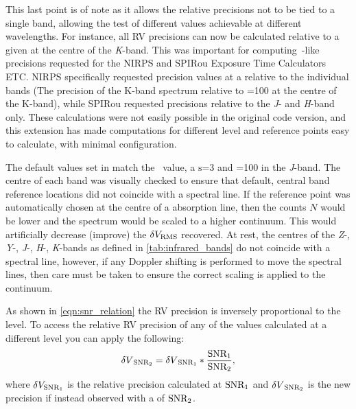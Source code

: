 This last point is of note as it allows the relative precisions not to be tied to a single band, allowing the test of different \snr{} values achievable at different wavelengths.
For instance, all {RV} precisions can now be calculated relative to a given \snr{} at the centre of the \textit{K}-band.
This was important for computing~\citet{figueira_radial_2016}-like precisions requested for the {NIRPS} and {SPIRou} Exposure Time Calculators {ETC}.
{NIRPS} specifically requested precision values at a \snr{} relative to the individual bands (The precision of the K-band spectrum relative to \snr{}=100 at the centre of the {K}-band), while {SPIRou} requested precisions relative to the \emph{J}- and \emph{H}-band only.
These calculations were not easily possible in the original code version, and this extension has made computations for different \snr{} level and reference points easy to calculate, with minimal configuration.

The default values set in \eniric{} match the~\citet{figueira_radial_2016} value, a \(\mathrm{s}\)=3 and \snr{}=100 in the \emph{J}-band.
The centre of each band was visually checked to ensure that default, central band reference locations did not coincide with a spectral line.
If the reference point was automatically chosen at the centre of a absorption line, then the counts \(N\) would be lower and the spectrum would be scaled to a higher continuum.
This would artificially decrease (improve) the \(\delta V_{\textrm{RMS}}\) recovered.
At rest, the centres of the \emph{Z}-, \emph{Y}-, \emph{J}-, \emph{H}-, \emph{K}-bands as defined in \cref{tab:infrared_bands} do not coincide with a spectral line, however, if any Doppler shifting is performed to move the spectral lines, then care must be taken to ensure the correct scaling is applied to the continuum.

As shown in \cref{eqn:snr_relation} the {RV} precision is inversely proportional to the \snr{} level.
To access the relative {RV} precision of any of the values calculated at a different \snr{} level you can apply the following:
\begin{equation}
{\delta V}_{{\textrm{SNR}{}}_{2}} = {\delta V}_{{\textrm{SNR}{}}_{1}} * \frac{{\textrm{SNR}{}}_{1}}{{\textrm{SNR}{}}_{2}},
\end{equation}
where \(\delta {V}_{{\textrm{SNR}{}}_{1}}\) is the relative precision calculated at \({\textrm{SNR}{}}_{1}\) and \({\delta V}_{{\textrm{SNR}{}}_{2}}\) is the new precision if instead observed with a \snr{} of \({\textrm{SNR}{}}_{2}\).



